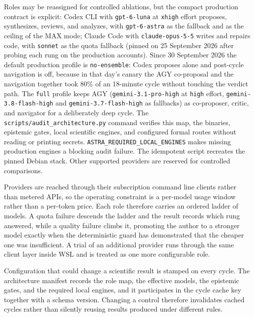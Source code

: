 \documentclass[11pt,a4paper]{article}
\begin{document}
Roles may be reassigned for controlled ablations, but the compact production contract is explicit: Codex CLI with \texttt{gpt-6-luna} at \texttt{xhigh} effort proposes, synthesizes, reviews, and analyzes, with \texttt{gpt-6-astra} as the fallback and as the ceiling of the MAX mode; Claude Code with \texttt{claude-opus-5-5} writes and repairs code, with \texttt{sonnet} as the quota fallback (pinned on 25 September 2026 after probing each rung on the production accounts). Since 30 September 2026 the default production profile is \texttt{no-ensemble}: Codex proposes alone and post-cycle navigation is off, because in that day's canary the AGY co-proposal and the navigation together took 80\% of an 18-minute cycle without touching the verdict path. The \texttt{full} profile keeps AGY (\texttt{gemini-3.1-pro-high} at \texttt{high} effort, \texttt{gemini-3.8-flash-high} and \texttt{gemini-3.7-flash-high} as fallbacks) as co-proposer, critic, and navigator for a deliberately deep cycle. The \texttt{scripts/audit\_architecture.py} command verifies this map, the binaries, epistemic gates, local scientific engines, and configured formal routes without reading or printing secrets. \texttt{ASTRA\_REQUIRED\_LOCAL\_ENGINES} makes missing production engines a blocking audit failure. The idempotent  script recreates the pinned Debian stack. Other supported providers are reserved for controlled comparisons.

Providers are reached through their subscription command line clients rather than metered APIs, so the operating constraint is a per-model usage window rather than a per-token price. Each role therefore carries an ordered ladder of models. A quota failure descends the ladder and the result records which rung answered, while a quality failure climbs it, promoting the author to a stronger model exactly when the deterministic guard has demonstrated that the cheaper one was insufficient. A trial of an additional provider runs through the same client layer inside WSL and is treated as one more configurable role.

Configuration that could change a scientific result is stamped on every cycle. The architecture manifest records the role map, the effective models, the epistemic gates, and the required local engines, and it participates in the cycle cache key together with a schema version. Changing a control therefore invalidates cached cycles rather than silently reusing results produced under different rules.
\end{document}
